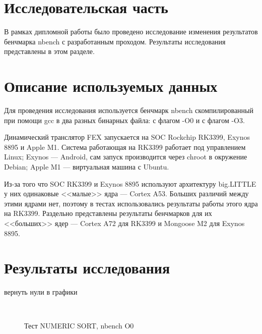 \section{Исследовательская часть}

В рамках дипломной работы было проведено исследование изменения результатов бенчмарка nbench с разработанным проходом. Результаты исследования представлены в этом разделе.

\section{Описание используемых данных}

Для проведения исследования используется бенчмарк nbench скомпилированный при помощи gcc в два разных бинарных файла: с флагом -O0 и с флагом -O3.

Динамический транслятор FEX запускается на SOC Rockchip RK3399, Exynos 8895 и Apple M1. Система работающая на RK3399 работает под управлением Linux; Exynos --- Android, сам запуск производится через chroot в окружение Debian; Apple M1 --- виртуальная машина с Ubuntu.

Из-за того что SOC RK3399 и Exynos 8895 используют архитектуру big.LITTLE у них одинаковые <<малые>> ядра --- Cortex A53. Больших различий между этими ядрами нет, поэтому в тестах использовались результаты работы этого ядра на RK3399. Раздельно представлены результаты бенчмарков для их <<больших>> ядер --- Cortex A72 для RK3399 и Mongoose M2 для Exynos 8895.

\section{Результаты исследования}

вернуть нули в графики

\begin{figure}[hbtp]
	\centering
	\\
	\caption{Тест NUMERIC SORT, nbench O0}
	\label{fig:speed}
\end{figure}


